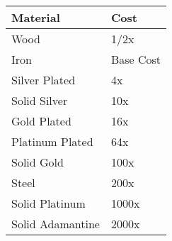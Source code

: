 \begin{normboxc}

\small
\begin{tabular}{@{}l l}
\textbf{Material} & \textbf{Cost}\\
\midrule
Wood  & 1/2x\\
Iron  & Base Cost\\
Silver Plated  & 4x\\
Solid Silver  & 10x\\
Gold Plated  & 16x\\
Platinum Plated  & 64x\\
Solid Gold  & 100x\\
Steel  & 200x\\
Solid Platinum  & 1000x\\
Solid Adamantine  & 2000x\\
\end{tabular}
\end{normboxc}
